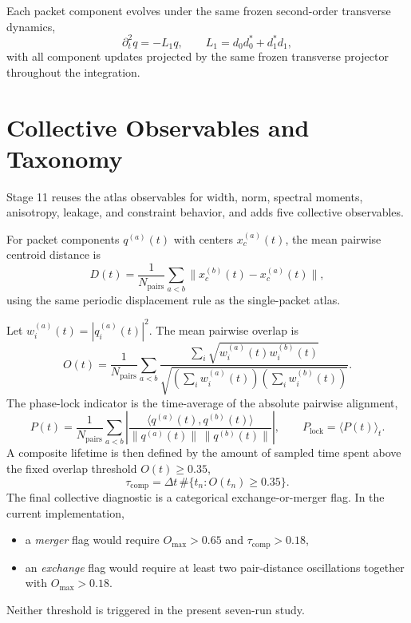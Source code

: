 \documentclass[11pt]{article}
\begin{document}
Each packet component evolves under the same frozen second-order transverse dynamics,
\begin{equation}
\partial_t^2 q = -L_1 q,
\qquad
L_1 = d_0 d_0^{*} + d_1^{*} d_1,
\end{equation}
with all component updates projected by the same frozen transverse projector throughout the integration.

\section{Collective Observables and Taxonomy}
Stage 11 reuses the atlas observables for width, norm, spectral moments, anisotropy, leakage, and constraint behavior, and adds five collective observables.

For packet components $q^{(a)}(t)$ with centers $x^{(a)}_c(t)$, the mean pairwise centroid distance is
\begin{equation}
D(t) = \frac{1}{N_{\mathrm{pairs}}}\sum_{a<b} \bigl\|x^{(b)}_c(t)-x^{(a)}_c(t)\bigr\|,
\end{equation}
using the same periodic displacement rule as the single-packet atlas.

Let $w^{(a)}_i(t)=|q^{(a)}_i(t)|^2$. The mean pairwise overlap is
\begin{equation}
O(t) = \frac{1}{N_{\mathrm{pairs}}}\sum_{a<b}
\frac{\sum_i \sqrt{w^{(a)}_i(t) w^{(b)}_i(t)}}{\sqrt{\left(\sum_i w^{(a)}_i(t)\right)\left(\sum_i w^{(b)}_i(t)\right)}}.
\end{equation}
The phase-lock indicator is the time-average of the absolute pairwise alignment,
\begin{equation}
P(t)=\frac{1}{N_{\mathrm{pairs}}}\sum_{a<b}
\left|\frac{\langle q^{(a)}(t),q^{(b)}(t)\rangle}{\|q^{(a)}(t)\|\,\|q^{(b)}(t)\|}\right|,
\qquad
P_{\mathrm{lock}} = \langle P(t)\rangle_t.
\end{equation}
A composite lifetime is then defined by the amount of sampled time spent above the fixed overlap threshold $O(t)\ge 0.35$,
\begin{equation}
\tau_{\mathrm{comp}} = \Delta t\,\#\{t_n : O(t_n) \ge 0.35\}.
\end{equation}
The final collective diagnostic is a categorical exchange-or-merger flag. In the current implementation,
\begin{itemize}
\item a \emph{merger} flag would require $O_{\max}>0.65$ and $\tau_{\mathrm{comp}}>0.18$,
\item an \emph{exchange} flag would require at least two pair-distance oscillations together with $O_{\max}>0.18$.
\end{itemize}
Neither threshold is triggered in the present seven-run study.
\end{document}
